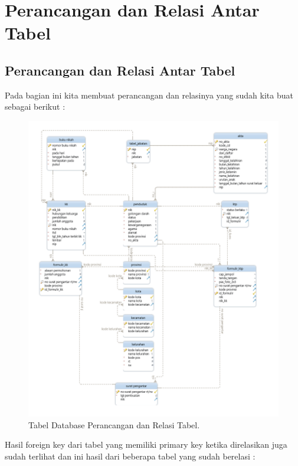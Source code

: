 \chapter{Perancangan dan Relasi Antar Tabel}

\section{Perancangan dan Relasi Antar Tabel}
Pada bagian ini kita membuat perancangan dan relasinya yang sudah kita buat sebagai berikut : 
\begin{figure}[H]
	\centering
	\includegraphics[width=12cm]{figures/0002.png}
	\caption{Tabel Database Perancangan dan Relasi Tabel.}
\end{figure}
Hasil foreign key dari tabel yang memiliki primary key ketika direlasikan juga sudah terlihat dan ini hasil dari beberapa tabel yang sudah berelasi :
